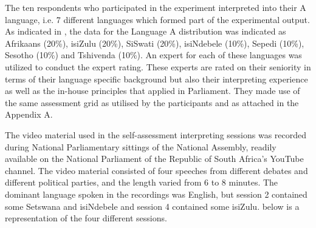 \documentclass[output=paper]{langsci/langscibook}
\begin{document}
The ten respondents who participated in the experiment interpreted into their A language, i.e. 7 different languages which formed part of the experimental output. As indicated in , the data for the Language A distribution was indicated as Afrikaans (20\%), isiZulu (20\%), SiSwati (20\%), isiNdebele (10\%), Sepedi (10\%), Sesotho (10\%) and Tshivenda (10\%). An expert for each of these languages was utilized to conduct the expert rating. These experts are rated on their seniority in terms of their language specific background but also their interpreting experience as well as the in-house principles that applied in Parliament. They made use of the same assessment grid as utilised by the participants and as attached in the Appendix A.

The video material used in the self-assessment interpreting sessions was re\-corded during National Parliamentary sittings of the National Assembly, readily available on the National Parliament of the Republic of South Africa’s YouTube channel. The video material consisted of four speeches from different debates and different political parties, and the length varied from 6 to 8 minutes. The dominant language spoken in the recordings was English, but session 2 contained some Setswana and isiNdebele and session 4 contained some isiZulu.  below is a representation of the four different sessions.

\begin{table}
\caption{\label{tab:deysel:3a}Summary of the different interpreting sessions}
\end{table}
\end{document}
